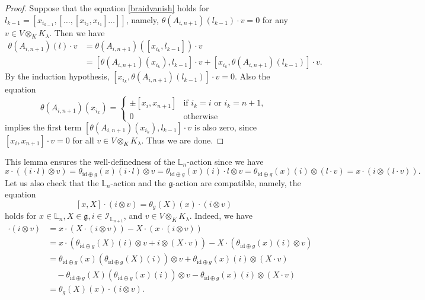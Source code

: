 \documentclass[a4paper,12pt]{article}
\theoremstyle{definition}
\theoremstyle{remark}
\begin{document}
\begin{proof}
Suppose that the equation \eqref{braidvanish}
holds for $l_{k-1}=[x_{i_{k-1}},[\ldots,[x_{i_2},x_{i_1}]\ldots]]$,
namely, $\theta(A_{i,n+1})(l_{k-1})\cdot v=0$
for any $v\in V\otimes_{K}K_{\lambda}$.
Then we have
\begin{align*}
\theta(A_{i,n+1})(l)\cdot v&=\theta(A_{i,n+1})([x_{i_{k}},l_{k-1}])\cdot v\\
&=
[\theta(A_{i,n+1})(x_{i_{k}}),l_{k-1}]\cdot v
+ [x_{i_{k}},\theta(A_{i,n+1})(l_{k-1})]\cdot v.
\end{align*}
By the induction hypothesis,
$[x_{i_{k}},\theta(A_{i,n+1})(l_{k-1})]\cdot v=0$.
Also the equation 
\[
\theta(A_{i,n+1})(x_{i_k})=
\begin{cases}
\pm [x_{i},x_{n+1}] & \text{if $i_{k}=i$ or $i_{k}=n+1$},\\
0 & \text{otherwise}
\end{cases}
\]
implies 
the first term $[\theta(A_{i,n+1})(x_{i_{k}}),l_{k-1}]\cdot v$ is also zero, 
since $[x_{i},x_{n+1}]\cdot v=0$ for all $v\in V\otimes_{K}K_{\lambda}$.
Thus we are done.
\end{proof}
This lemma ensures the well-definedness of the $\mathbb{L}_{n}$-action
since we have 
\[
	x\cdot ((i\cdot l)\otimes v)=\theta_{\mathrm{id}\oplus g}(x)(i\cdot l)\otimes v
=\theta_{\mathrm{id}\oplus g}(x)(i)\cdot l\otimes v
=\theta_{\mathrm{id}\oplus g}(x)(i)\otimes (l\cdot v)
=x\cdot (i\otimes (l\cdot v)).
\]
Let us also check that the $\mathbb{L}_{n}$-action and the $\mathfrak{g}$-action are compatible, namely, the equation
\[
	[x,X]\cdot (i\otimes v)=\theta_{g}(X)(x)\cdot (i\otimes v)
\]
holds for $x\in \mathbb{L}_{n}, X\in \mathfrak{g}, i\in \mathcal{I}_{\mathbb{L}_{n+1}}$, and $v\in V\otimes_{K}K_{\lambda}$.
Indeed, we have 
\begin{align*}
[x,X]\cdot (i\otimes v)&=x\cdot (X\cdot (i\otimes v))-X\cdot (x\cdot (i\otimes v))\\
&=x\cdot (\theta_{\mathrm{id}\oplus g}(X)(i)\otimes v+i\otimes (X\cdot v))-X\cdot (\theta_{\mathrm{id}\oplus g}(x)(i)\otimes v)\\
&=\theta_{\mathrm{id}\oplus g}(x)(\theta_{\mathrm{id}\oplus g}(X)(i))\otimes v+\theta_{\mathrm{id}\oplus g}(x)(i)\otimes (X\cdot v)\\
&\quad -\theta_{\mathrm{id}\oplus g}(X)(\theta_{\mathrm{id}\oplus g}(x)(i))\otimes v
-\theta_{\mathrm{id}\oplus g}(x)(i)\otimes (X\cdot v)
\\
&=\theta_{g}(X)(x)\cdot (i\otimes v).
\end{align*}
\end{document}
